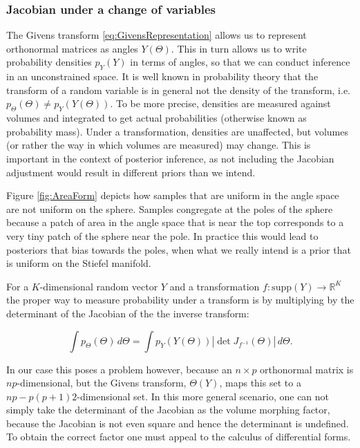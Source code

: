\documentclass{article}
\begin{document}
\subsubsection{Jacobian under a change of variables}
The Givens transform \ref{eq:GivensRepresentation} allows us to represent orthonormal matrices as angles $Y(\Theta)$. This in turn allows us to write probability densities $p_Y(Y)$ in terms of angles, so that we can conduct inference in an unconstrained space. It is well known in probability theory that the transform of a random variable is in general not the density of the transform, i.e. $p_\Theta(\Theta) \neq p_Y(Y(\Theta))$\citep[chapt.~2.6]{murphy2012machine}. To be more precise, densities are measured against volumes and integrated to get actual probabilities (otherwise known as probability mass). Under a transformation, densities are unaffected, but volumes (or rather the way in which volumes are measured) may change. This is important in the context of posterior inference, as not including the Jacobian adjustment would result in different priors than we intend.

Figure \ref{fig:AreaForm} depicts how samples that are uniform in the angle space are not uniform on the sphere. Samples congregate at the poles of the sphere because a patch of area in the angle space that is near the top corresponds to a very tiny patch of the sphere near the pole. In practice this would lead to posteriors that bias towards the poles, when what we really intend is a prior that is uniform on the Stiefel manifold.

For a $K$-dimensional random vector $Y$ and a transformation $f: \mathrm{supp}(Y) \to \mathbb{R}^K$ the proper way to measure probability under a transform is by multiplying by the determinant of the Jacobian of the the inverse transform:

\begin{equation}
\int p_\Theta(\Theta)\, d\Theta = \int p_Y(Y(\Theta)) |\det J_{f^{-1}}(\Theta)|\, d\Theta.
\end{equation}

In our case this poses a problem however, because an $n \times p$ orthonormal matrix is $np$-dimensional, but the Givens transform, $\Theta(Y)$, maps this set to a $np - p(p+1)2$-dimensional set. In this more general scenario, one can not simply take the determinant of the Jacobian as the volume morphing factor, because the Jacobian is not even square and hence the determinant is undefined. To obtain the correct factor one must appeal to the calculus of differential forms. 
\end{document}

